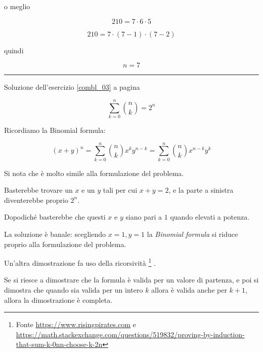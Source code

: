 o meglio

\begin{equation*}
210=7\cdot6\cdot5
\end{equation*}

\begin{equation*}
210=7\cdot(7-1)\cdot(7-2)
\end{equation*}

quindi 

\begin{equation*}
n=7
\end{equation*}

\vspace{1cm}
\hrule
\vspace{1cm}



Soluzione dell'esercizio \ref{combl_03} a pagina \pageref{combl_03}\label{combs_03}

\begin{equation*}
\sum_{k=0}^{n}{\binom{n}{k}}=2^n
\end{equation*}

Ricordiamo la Binomial formula:

\begin{equation}
(x+y)^n=\sum_{k=0}^{n}{\binom{n}{k}x^{k}y^{n-k}}
=\sum_{k=0}^{n}{\binom{n}{k}x^{n-k}y^{k}}
\end{equation}

Si nota che è molto simile alla formulazione del problema.

Basterebbe trovare un $x$ e un $y$ tali per cui $x+y=2$, e la parte a sinistra diventerebbe proprio $2^n$.

Dopodiché basterebbe che questi $x$ e $y$ siano pari a $1$ quando elevati a potenza.

La soluzione è banale: scegliendo $x=1, y=1$ la \emph{Binomial formula} si riduce proprio alla formulazione del problema.

\vspace{1cm}

Un'altra dimostrazione fa uso della ricorsività
\footnote{Fonte 
\href{https://www.risingpirates.com}{https://www.risingpirates.com}
e
\href{https://math.stackexchange.com/questions/519832/proving-by-induction-that-sum-k-0nn-choose-k-2n}
{https://math.stackexchange.com/questions/519832/proving-by-induction-that-sum-k-0nn-choose-k-2n}
}
.


Se si riesce a dimostrare che la formula è valida per un valore di partenza, e poi si dimostra che quando sia valida per un intero $k$ allora è valida anche per $k+1$, allora la dimostrazione è completa.

